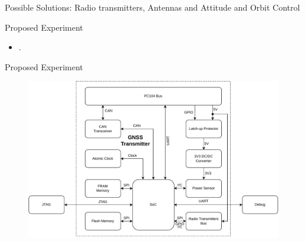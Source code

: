 \begin{frame}{Possible Solutions: Radio transmitters, Antennas and Attitude and Orbit Control}

\end{frame}

\begin{frame}{Proposed Experiment}

    \begin{itemize}
        \item .
    \end{itemize}

\end{frame}

\begin{frame}{Proposed Experiment}

    \begin{figure}[!ht]
        \begin{center}
            \includegraphics[scale=0.5]{figures/block-diagram}
        \end{center}
    \end{figure}

\end{frame}

